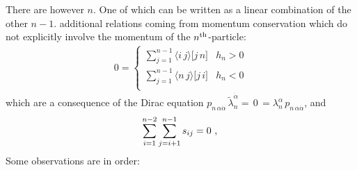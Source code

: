 \documentclass[aps,prd,nofootinbib,twocolumn,10pt]{revtex4-2}
\newcommand{\agl}[2]{\langle#1\, #2 \rangle}
\newcommand{\sqr}[2]{\lbrack #1\, #2 \rbrack}
\newcommand{\tlambda}{\widetilde{\lambda}}
\begin{document}
There are however $n$. One of which can be written as a linear combination of the other $n-1$. additional relations coming from momentum conservation which do not explicitly involve the momentum of the $n^{\rm th}$-particle:
\begin{align}
\label{eq::momcons2}
    0 = 
    \begin{cases}
        \sum\limits_{j=1}^{n-1} \agl{i}{j} \sqr{j}{n} &  h_n>0\\[.5em]
        \sum\limits_{j=1}^{n-1} \agl{n}{j} \sqr{j}{i} &  h_n<0\\
    \end{cases}
\end{align}
which are a consequence of the Dirac equation $p_{n\, \alpha \dot{\alpha}}\, \tlambda_{n}^{\dot{\alpha}}=\, 0 \, = \lambda^{\alpha}_n\, p_{n\, \alpha \dot{\alpha}}$, and
\begin{equation}
\label{eq::momcons1}
    \sum_{i=1}^{n-2} \sum_{j=i+1}^{n-1} s_{i j} = 0\ ,\\
\end{equation}
Some observations are in order:
\end{document}
